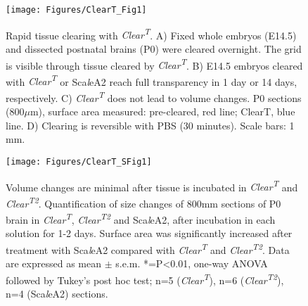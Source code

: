 \begin{figure}[hbtp]
\begin{center}
\texttt{[image: Figures/ClearT\_Fig1]}
\caption[Rapid tissue clearing with \emph{Clear\textsuperscript{T}}.]
{Rapid tissue clearing with \emph{Clear\textsuperscript{T}}.
A) Fixed whole embryos (E14.5) and dissected postnatal brains (P0) were cleared overnight.
The grid is visible through tissue cleared by \emph{Clear\textsuperscript{T}}.
B) E14.5 embryos cleared with \emph{Clear\textsuperscript{T}} or Sca\emph{l}eA2 reach full transparency in 1 day or 14 days,
respectively.
C) \emph{Clear\textsuperscript{T}} does not lead to volume changes.
P0 sections (800$\mu$m), surface area measured: pre-cleared, red line; ClearT, blue line.
D) Clearing is reversible with PBS (30 minutes).
Scale bars: 1 mm.
}
\label{ClearTFig1}
\end{center}
\end{figure}

\begin{figure}[hbtp]
\begin{center}
\texttt{[image: Figures/ClearT\_SFig1]}
\caption[Volume changes are minimal after tissue is incubated in \emph{Clear\textsuperscript{T}} and \emph{Clear\textsuperscript{T2}}.]
{Volume changes are minimal after tissue is incubated in \emph{Clear\textsuperscript{T}} and \emph{Clear\textsuperscript{T2}}.
Quantification of size changes of 800mm sections of P0 brain in \emph{Clear\textsuperscript{T}}, \emph{Clear\textsuperscript{T2}} and Sca\emph{l}eA2, after incubation in each solution for 1-2 days.
Surface area was significantly increased after treatment with Sca\emph{l}eA2 compared with \emph{Clear\textsuperscript{T}} and \emph{Clear\textsuperscript{T2}}.
Data are expressed as mean $\pm$ s.e.m.
*=P<0.01, one-way ANOVA followed by Tukey's post hoc test; n=5 (\emph{Clear\textsuperscript{T}}), n=6 (\emph{Clear\textsuperscript{T2}}), n=4 (Sca\emph{l}eA2) sections.
}
\label{ClearTSFig1}
\end{center}
\end{figure}
